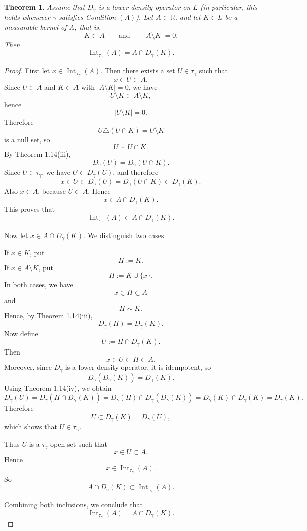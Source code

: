 \documentclass{amsart}
\newtheorem{theorem}{Theorem}
\theoremstyle{plain}
\numberwithin{equation}{section}
\begin{document}
\begin{theorem}\label{9}
Assume that $D_{\gamma}$ is a lower-density operator on $L$ (in particular, this holds whenever $\gamma$ satisfies Condition $(A)$). Let $A \subset \mathbb{R}$, and let $K \in L$ be a measurable kernel of $A$, that is,
$$
K \subset A
\qquad\text{and}\qquad
|A\setminus K|=0.
$$
Then
$$
\operatorname{Int}_{\tau_{\gamma}}(A)=A\cap D_{\gamma}(K).
$$
\end{theorem}

\begin{proof}
First let $x \in \operatorname{Int}_{\tau_{\gamma}}(A)$. Then there exists a set $U \in \tau_{\gamma}$ such that
$$
x \in U \subset A.
$$
Since $U \subset A$ and $K \subset A$ with $|A\setminus K|=0$, we have
$$
U\setminus K \subset A\setminus K,
$$
hence
$$
|U\setminus K|=0.
$$
Therefore
$$
U\triangle (U\cap K)=U\setminus K
$$
is a null set, so
$$
U \sim U\cap K.
$$
By Theorem 1.14(iii),
$$
D_{\gamma}(U)=D_{\gamma}(U\cap K).
$$
Since $U\in\tau_{\gamma}$, we have $U\subset D_{\gamma}(U)$, and therefore
$$
x\in U \subset D_{\gamma}(U)=D_{\gamma}(U\cap K)\subset D_{\gamma}(K).
$$
Also $x\in A$, because $U\subset A$. Hence
$$
x\in A\cap D_{\gamma}(K).
$$
This proves that
$$
\operatorname{Int}_{\tau_{\gamma}}(A)\subset A\cap D_{\gamma}(K).
$$

Now let $x\in A\cap D_{\gamma}(K)$. We distinguish two cases.

If $x\in K$, put
$$
H:=K.
$$
If $x\in A\setminus K$, put
$$
H:=K\cup\{x\}.
$$
In both cases, we have
$$
x\in H\subset A
$$
and
$$
H\sim K.
$$
Hence, by Theorem 1.14(iii),
$$
D_{\gamma}(H)=D_{\gamma}(K).
$$
Now define
$$
U:=H\cap D_{\gamma}(K).
$$
Then
$$
x\in U\subset H\subset A.
$$
Moreover, since $D_{\gamma}$ is a lower-density operator, it is idempotent, so
$$
D_{\gamma}(D_{\gamma}(K))=D_{\gamma}(K).
$$
Using Theorem 1.14(iv), we obtain
$$
D_{\gamma}(U)
=
D_{\gamma}(H\cap D_{\gamma}(K))
=
D_{\gamma}(H)\cap D_{\gamma}(D_{\gamma}(K))
=
D_{\gamma}(K)\cap D_{\gamma}(K)
=
D_{\gamma}(K).
$$
Therefore
$$
U\subset D_{\gamma}(K)=D_{\gamma}(U),
$$
which shows that $U\in\tau_{\gamma}$.

Thus $U$ is a $\tau_{\gamma}$-open set such that
$$
x\in U\subset A.
$$
Hence
$$
x\in \operatorname{Int}_{\tau_{\gamma}}(A).
$$
So
$$
A\cap D_{\gamma}(K)\subset \operatorname{Int}_{\tau_{\gamma}}(A).
$$

Combining both inclusions, we conclude that
$$
\operatorname{Int}_{\tau_{\gamma}}(A)=A\cap D_{\gamma}(K).
$$
\end{proof}
\end{document}
